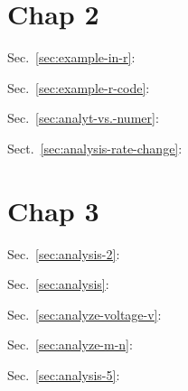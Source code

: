 
\chapter*{Chap 2}
\label{chap:chap-2}

Sec.~\ref{sec:example-in-r}:\label{chap1.1.r}



Sec.~\ref{sec:example-r-code}: \label{chap1.2.r}


Sec.~\ref{sec:analyt-vs.-numer}:\label{chap1.3.r}


Sect.~\ref{sec:analysis-rate-change}:\label{chap1.4.r}
  

\chapter{Chap 3}
\label{chap:chap-3}

Sec.~\ref{sec:analysis-2}:\label{chap2.1.r}


Sec.~\ref{sec:analysis}:\label{chap2.2.r}


Sec.~\ref{sec:analyze-voltage-v}:\label{HH_model}


Sec.~\ref{sec:analyze-m-n}:\label{chap2.3.r}


Sec.~\ref{sec:analysis-5}:\label{Noble_model}


